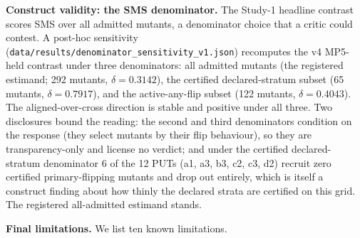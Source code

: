 \documentclass[manuscript,screen,review]{acmart}
\begin{document}
\textbf{Construct validity: the SMS denominator.} The Study-1 headline
contrast scores SMS over all admitted mutants, a denominator choice that a
critic could contest. A post-hoc sensitivity
(\texttt{data/results/denominator\_sensitivity\_v1.json}) recomputes the v4
MP5-held contrast under three denominators: all admitted mutants (the
registered estimand; 292 mutants, \(\delta = 0.3142\)), the certified
declared-stratum subset (65 mutants, \(\delta = 0.7917\)), and the
active-any-flip subset (122 mutants, \(\delta = 0.4043\)). The
aligned-over-cross direction is stable and positive under all three. Two
disclosures bound the reading: the second and third denominators condition on
the response (they select mutants by their flip behaviour), so they are
transparency-only and license no verdict; and under the certified
declared-stratum denominator 6 of the 12 PUTs (a1, a3, b3, c2, c3, d2)
recruit zero certified primary-flipping mutants and drop out entirely, which
is itself a construct finding about how thinly the declared strata are
certified on this grid. The registered all-admitted estimand stands.

\textbf{Final limitations.} We list ten known limitations.
\end{document}
